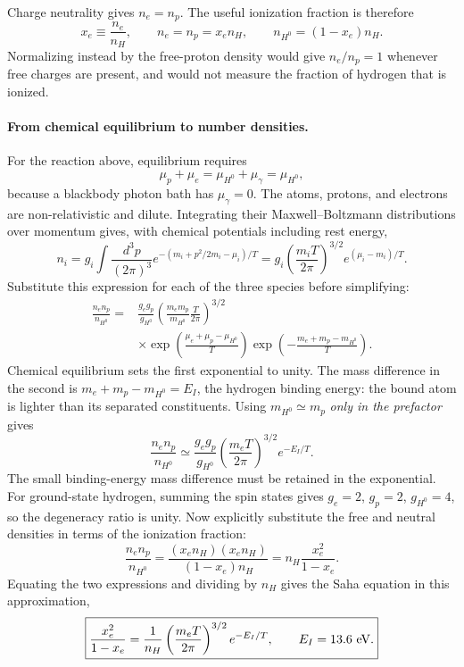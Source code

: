 \documentclass[12pt]{article}
\newcommand{\be}{\begin{eqnarray}}
\newcommand{\ee}{\end{eqnarray}}
\begin{document}
Charge neutrality gives $n_e=n_p$. The useful ionization fraction is therefore
\[
x_e\equiv\frac{n_e}{n_H},\qquad
n_e=n_p=x_en_H,\qquad n_{H^0}=(1-x_e)n_H.
\]
Normalizing instead by the free-proton density would give $n_e/n_p=1$
whenever free charges are present, and would not measure the fraction of
hydrogen that is ionized.

\paragraph{From chemical equilibrium to number densities.}
For the reaction above, equilibrium requires
\[
\mu_p+\mu_e=\mu_{H^0}+\mu_\gamma=\mu_{H^0},
\]
because a blackbody photon bath has $\mu_\gamma=0$. The atoms, protons, and electrons
are non-relativistic and dilute. Integrating their Maxwell--Boltzmann distributions
over momentum gives, with chemical potentials including rest energy,
\[
n_i=g_i\int\frac{d^3p}{(2\pi)^3}
e^{-(m_i+p^2/2m_i-\mu_i)/T}
=g_i\left(\frac{m_iT}{2\pi}\right)^{3/2}e^{(\mu_i-m_i)/T}.
\]
Substitute this expression for each of the three species before simplifying:
\[
\begin{aligned}
\frac{n_en_p}{n_{H^0}}
={}&\frac{g_eg_p}{g_{H^0}}
\left(\frac{m_em_p}{m_{H^0}}\frac{T}{2\pi}\right)^{3/2}\\
&\times\exp\!\left(\frac{\mu_e+\mu_p-\mu_{H^0}}{T}\right)
\exp\!\left(-\frac{m_e+m_p-m_{H^0}}{T}\right).
\end{aligned}
\]
Chemical equilibrium sets the first exponential to unity. The mass
difference in the second is $m_e+m_p-m_{H^0}=E_I$, the hydrogen binding energy:
the bound atom is lighter than its separated constituents. Using
$m_{H^0}\simeq m_p$ \emph{only in the prefactor} gives
\[
\frac{n_en_p}{n_{H^0}}\simeq
\frac{g_eg_p}{g_{H^0}}\left(\frac{m_eT}{2\pi}\right)^{3/2}e^{-E_I/T}.
\]
The small binding-energy mass difference must be retained in the exponential.
For ground-state hydrogen, summing the spin states gives $g_e=2$, $g_p=2$,
$g_{H^0}=4$, so the degeneracy ratio is unity. Now explicitly substitute the
free and neutral densities in terms of the ionization fraction:
\[
\frac{n_en_p}{n_{H^0}}
=\frac{(x_en_H)(x_en_H)}{(1-x_e)n_H}
=n_H\frac{x_e^2}{1-x_e}.
\]
Equating the two expressions and dividing by $n_H$ gives the Saha equation
in this approximation,
\be
\boxed{
\frac{x_e^2}{1-x_e}=\frac{1}{n_H}
\left(\frac{m_eT}{2\pi}\right)^{3/2}e^{-E_I/T},
\qquad E_I=13.6\ {\rm eV}.}
\label{eq:Saha}
\ee
\end{document}
